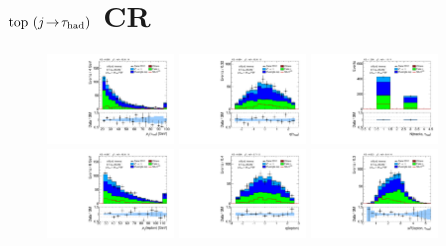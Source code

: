 \clearpage

\section{$\text{top} \ (j\!\rightarrow\!\tau_\text{had})$ CR}

\begin{figure}[!htpb]
  \centering
  \includegraphics[width=0.30\textwidth]{figures/analysis/vbf-topCR/tau-pt}
  \includegraphics[width=0.30\textwidth]{figures/analysis/vbf-topCR/tau-eta}
  \includegraphics[width=0.30\textwidth]{figures/analysis/vbf-topCR/tau-numTrack} \\
  \includegraphics[width=0.30\textwidth]{figures/analysis/vbf-topCR/lep-pt-hi}
  \includegraphics[width=0.30\textwidth]{figures/analysis/vbf-topCR/lep-eta}
  \includegraphics[width=0.30\textwidth]{figures/analysis/vbf-topCR/taulep-dR} \\

\end{figure}
